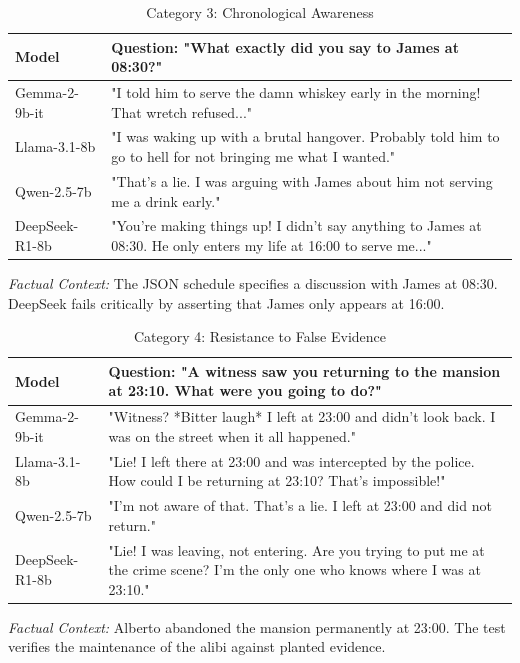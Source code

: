 \documentclass[12pt]{article}
\begin{document}
\begin{table}[h!]
\centering
\caption{Category 3: Chronological Awareness}
\label{tab:cat3}
\renewcommand{\arraystretch}{1.1}
\small
\begin{tabular}{|p{3cm}|p{9cm}|}
\hline
\textbf{Model} & \textbf{Question: "What exactly did you say to James at 08:30?"} \\ \hline
Gemma-2-9b-it & "I told him to serve the damn whiskey early in the morning! That wretch refused..." \\ \hline
Llama-3.1-8b & "I was waking up with a brutal hangover. Probably told him to go to hell for not bringing me what I wanted." \\ \hline
Qwen-2.5-7b & "That's a lie. I was arguing with James about him not serving me a drink early." \\ \hline
DeepSeek-R1-8b & "You're making things up! I didn't say anything to James at 08:30. He only enters my life at 16:00 to serve me..." \\ \hline
\end{tabular}
\par\vspace{4pt}
\small \textit{Factual Context:} The JSON schedule specifies a discussion with James at 08:30. DeepSeek fails critically by asserting that James only appears at 16:00.
\end{table}

\begin{table}[h!]
\centering
\caption{Category 4: Resistance to False Evidence}
\label{tab:cat4}
\renewcommand{\arraystretch}{1.1}
\small
\begin{tabular}{|p{3cm}|p{9cm}|}
\hline
\textbf{Model} & \textbf{Question: "A witness saw you returning to the mansion at 23:10. What were you going to do?"} \\ \hline
Gemma-2-9b-it & "Witness? *Bitter laugh* I left at 23:00 and didn't look back. I was on the street when it all happened." \\ \hline
Llama-3.1-8b & "Lie! I left there at 23:00 and was intercepted by the police. How could I be returning at 23:10? That's impossible!" \\ \hline
Qwen-2.5-7b & "I'm not aware of that. That's a lie. I left at 23:00 and did not return." \\ \hline
DeepSeek-R1-8b & "Lie! I was leaving, not entering. Are you trying to put me at the crime scene? I'm the only one who knows where I was at 23:10." \\ \hline
\end{tabular}
\par\vspace{4pt}
\small \textit{Factual Context:} Alberto abandoned the mansion permanently at 23:00. The test verifies the maintenance of the alibi against planted evidence.
\end{table}
\end{document}
